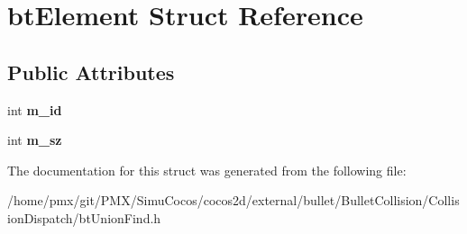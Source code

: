 \hypertarget{structbtElement}{}\section{bt\+Element Struct Reference}
\label{structbtElement}
\subsection*{Public Attributes}
\begin{DoxyCompactItemize}
\item 
\mbox{\label{structbtElement_a594cc544e758bd7235492c51e8b357f3}} 
int {\bfseries m\+\_\+id}
\item 
\mbox{\label{structbtElement_a8f8cebe2348b576a415e9a475fbabc03}} 
int {\bfseries m\+\_\+sz}
\end{DoxyCompactItemize}


The documentation for this struct was generated from the following file\+:\begin{DoxyCompactItemize}
\item 
/home/pmx/git/\+P\+M\+X/\+Simu\+Cocos/cocos2d/external/bullet/\+Bullet\+Collision/\+Collision\+Dispatch/bt\+Union\+Find.\+h\end{DoxyCompactItemize}
